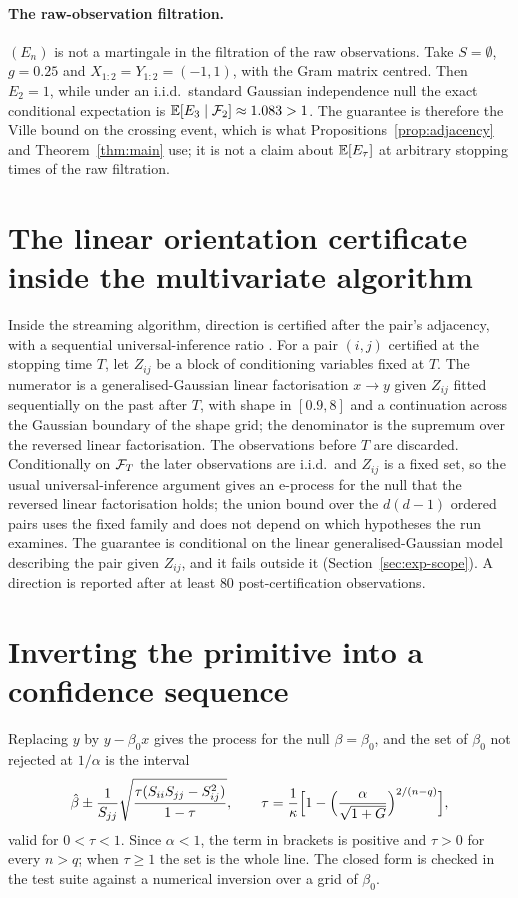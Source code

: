 \paragraph{The raw-observation filtration.} $(E_n)$ is not a martingale in the
filtration of the raw observations. Take $S=\emptyset$, $g=0.25$ and
$X_{1:2}=Y_{1:2}=(-1,1)$, with the Gram matrix centred. Then $E_2=1$, while
under an i.i.d.\ standard Gaussian independence null the exact conditional
expectation is $\mathbb{E}[E_3\mid\mathcal{F}_2]\approx1.083>1$. The guarantee is therefore
the Ville bound on the crossing event, which is what
Propositions~\ref{prop:adjacency} and Theorem~\ref{thm:main} use; it is not a
claim about $\mathbb{E}[E_\tau]$ at arbitrary stopping times of the raw filtration.

\section{The linear orientation certificate inside the multivariate algorithm}
\label{app:linear}

Inside the streaming algorithm, direction is certified after the pair's
adjacency, with a sequential universal-inference ratio
\citep{wasserman2020universal}. For a pair $(i,j)$ certified at the stopping time
$T$, let $Z_{ij}$ be a block of conditioning variables fixed at $T$. The
numerator is a generalised-Gaussian linear factorisation $x\to y$ given $Z_{ij}$
fitted sequentially on the past after $T$, with shape in $[0.9,8]$ and a
continuation across the Gaussian boundary of the shape grid; the denominator is
the supremum over the reversed linear factorisation. The observations before
$T$ are discarded. Conditionally on $\mathcal{F}_T$ the later observations are i.i.d.\
and $Z_{ij}$ is a fixed set, so the usual universal-inference argument gives an
e-process for the null that the reversed linear factorisation holds; the union
bound over the $d(d-1)$ ordered pairs uses the fixed family and does not depend
on which hypotheses the run examines. The guarantee is conditional on the linear
generalised-Gaussian model describing the pair given $Z_{ij}$, and it fails
outside it (Section~\ref{sec:exp-scope}). A direction is reported after at least
$80$ post-certification observations.

\section{Inverting the primitive into a confidence sequence}\label{app:cs}

Replacing $y$ by $y-\beta_0x$ gives the process for the null $\beta=\beta_0$,
and the set of $\beta_0$ not rejected at $1/\alpha$ is the interval
\[
\hat\beta\pm\frac{1}{S_{jj}}\sqrt{\frac{\tau(S_{ii}S_{jj}-S_{ij}^2)}{1-\tau}},\qquad
\tau=\frac1\kappa\Bigl[1-\Bigl(\frac{\alpha}{\sqrt{1+G}}\Bigr)^{2/(n-q)}\Bigr],
\]
valid for $0<\tau<1$. Since $\alpha<1$, the term in brackets is positive and
$\tau>0$ for every $n>q$; when $\tau\ge1$ the set is the whole line. The closed
form is checked in the test suite against a numerical inversion over a grid of
$\beta_0$.

